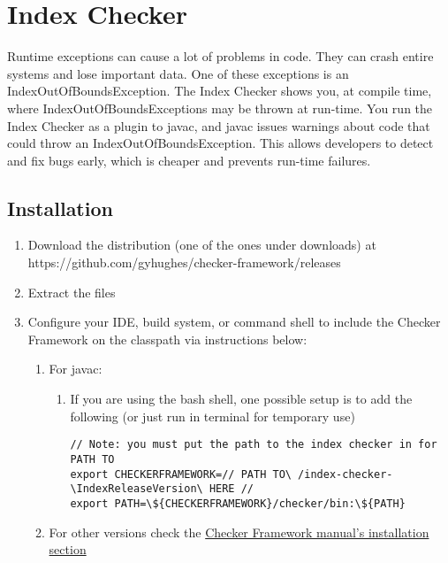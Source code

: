 \chapter{Index Checker\label{index-checker}}

Runtime exceptions can cause a lot of problems in code. They can crash entire systems and lose important data. One of these exceptions is an IndexOutOfBoundsException. The Index Checker shows you, at compile time, where IndexOutOfBoundsExceptions may be thrown at run-time. You run the Index Checker as a plugin to javac, and javac issues warnings about code that could throw an IndexOutOfBoundsException. This allows developers to detect and fix bugs early, which is cheaper and prevents run-time failures.

\section{Installation\label{index-installation}}

\begin{enumerate}
\item Download the distribution (one of the ones under downloads) at 
https://github.com/gyhughes/checker-framework/releases
\item Extract the files
\item Configure your IDE, build system, or command shell to include the Checker Framework 
on the classpath via instructions below:
\begin{enumerate}
\item For javac:
\begin{enumerate}
\item If you are using the bash shell, one possible setup is to add the following 
(or just run in terminal for temporary use)

\begin{Verbatim}
// Note: you must put the path to the index checker in for PATH TO 
export CHECKERFRAMEWORK=// PATH TO\ /index-checker-\IndexReleaseVersion\ HERE //
export PATH=\${CHECKERFRAMEWORK}/checker/bin:\${PATH}
\end{Verbatim}

\end{enumerate}
\item For other versions check the \href{http://types.cs.washington.edu/checker-framework/current/checker-framework-manual.html#installation}{Checker Framework manual's installation section}
\end{enumerate}
\end{enumerate}

